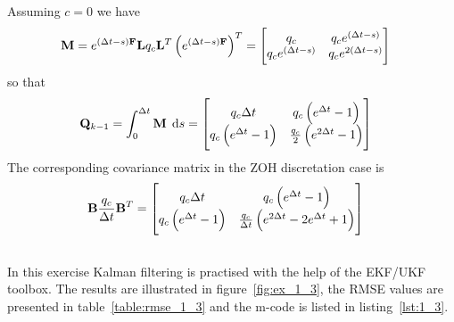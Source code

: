\documentclass[a4paper,oneside,article]{memoir}
\begin{document}
\subsubsection{}

Assuming $c=0$ we have
\begin{align}
	\mathbf{M}=e^{(\Delta t-s)\mathbf{F}}\mathbf{L}q_c\mathbf{L}^T\left(e^{(\Delta t-s)\mathbf{F}}\right)^T&=
	\begin{bmatrix}
	q_c & q_ce^{\left(\Delta t-s\right)}\\
	q_ce^{(\Delta t-s)} & q_ce^{2\left(\Delta t-s\right)}
	\end{bmatrix}
\end{align}
so that
\begin{align}
	\v{Q}_{k-1}&=\defint{0}{\Delta t}{\v{M}}{s}=
	\begin{bmatrix}
		q_c\Delta t & q_c\left(e^{\Delta t}-1\right)\\
		q_c\left(e^{\Delta t}-1\right) & \frac{q_c}{2}\left(e^{2\Delta t}-1\right)
	\end{bmatrix}
\end{align}
The corresponding covariance matrix in the ZOH discretation case is
\begin{align}
	\mathbf{B}\frac{q_c}{\Delta t}\mathbf{B}^T&=\begin{bmatrix}
		q_c\Delta t & q_c\left(e^{\Delta t}-1\right)\\
		q_c\left(e^{\Delta t}-1\right) & \frac{q_c}{\Delta t}\left(e^{2\Delta t}-2e^{\Delta t}+1\right)
	\end{bmatrix}
\end{align}

\subsection{}\label{sec:1_3}


In this exercise Kalman filtering is practised with the help of the EKF/UKF toolbox.
The results are illustrated in figure~\ref{fig:ex_1_3}, the RMSE values are presented
in table~\ref{table:rmse_1_3} and the m-code is listed in listing~\ref{lst:1_3}.
\end{document}
